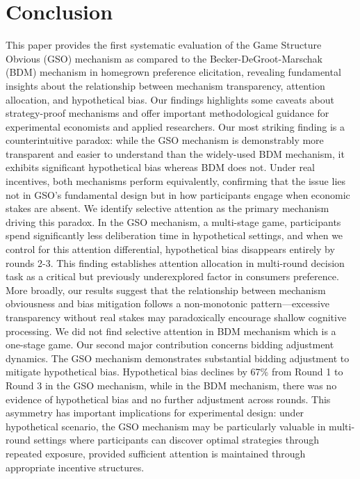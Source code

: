 \documentclass[12pt]{article}
\begin{document}
\section{Conclusion}
\label{Conclusion}

This paper provides the first systematic evaluation of the Game Structure Obvious (GSO) mechanism as compared to the Becker-DeGroot-Marschak (BDM) mechanism in homegrown preference elicitation, revealing fundamental insights about the relationship between mechanism transparency, attention allocation, and hypothetical bias. Our findings highlights some caveats about strategy-proof mechanisms and offer important methodological guidance for experimental economists and applied researchers.
Our most striking finding is a counterintuitive paradox: while the GSO mechanism is demonstrably more transparent and easier to understand than the widely-used BDM mechanism, it exhibits significant hypothetical bias whereas BDM does not. Under real incentives, both mechanisms perform equivalently, confirming that the issue lies not in GSO's fundamental design but in how participants engage when economic stakes are absent.
We identify selective attention as the primary mechanism driving this paradox. In the GSO mechanism, a multi-stage game, participants spend significantly less deliberation time in hypothetical settings, and when we control for this attention differential, hypothetical bias disappears entirely by rounds 2-3. This finding establishes attention allocation in multi-round decision task as a critical but previously underexplored factor in consumers preference. More broadly, our results suggest that the relationship between mechanism obviousness and bias mitigation follows a non-monotonic pattern—excessive transparency without real stakes may paradoxically encourage shallow cognitive processing. We did not find selective attention in BDM mechanism which is a one-stage game.
Our second major contribution concerns bidding adjustment dynamics. The GSO mechanism demonstrates substantial bidding adjustment to mitigate hypothetical bias. Hypothetical bias declines by 67\% from Round 1 to Round 3 in the GSO mechanism, while in the BDM mechanism, there was no evidence of hypothetical bias and no further adjustment across rounds. This asymmetry has important implications for experimental design: under hypothetical scenario, the GSO mechanism may be particularly valuable in multi-round settings where participants can discover optimal strategies through repeated exposure, provided sufficient attention is maintained through appropriate incentive structures.
\end{document}
